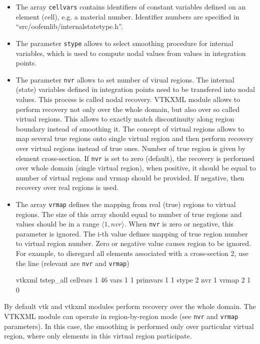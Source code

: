 \documentclass[a4paper]{article}
\newcommand{\param}[1]{\texttt{#1}} %
\begin{document}
\begin{itemize}
\begin{itemize}
\item The array \param{cellvars} contains identifiers of constant variables defined
on an element (cell), e.g. a material number. Identifier numbers are specified in
``src/oofemlib/internalstatetype.h''.

\item The parameter \param{stype} allows to select smoothing procedure for
internal variables, which is used to compute nodal values from values
in integration points.

\item The parameter \param{nvr} allows to set number of virual regions. The internal (state) variables defined in integration points need to be transfered into nodal values. This process is called nodal recovery. VTKXML module allows to perform recovery not only over the whole domain, but also over so called virtual regions. This allows to exactly match discontinuity along region boundary instead of smoothing it. The concept of virtual regions allows to map several true regions onto single virtual region and then perform recovery over virtual regions instead of true ones. Number of true region is given by element cross-section. If \param{nvr} is set to zero (default), the recovery is performed over whole domain (single virtual region), when positive, it should be equal to number of virtual regions and vrmap should be provided. If negative, then recovery over real regions is used.

\item The array \param{vrmap} defines the mapping from real (true) regions to virtual regions. The size of this array
should equal to number of true regions and values should be in a range $\langle 1, nvr \rangle$. When \param{nvr} is zero or negative, this parameter is ignored. The i-th value defines mapping of true region number to virtual region number. Zero or negative value causes region to be ignored. For example, to disregard all elements associated with a cross-section 2, use the line (relevant are \param{nvr} and \param{vrmap})

{\footnotesize vtkxml tstep\_all cellvars 1 46 vars 1 1 primvars 1 1 stype 2 nvr 1 vrmap 2 1 0}


\end{itemize}

By default vtk and vtkxml modules perform recovery over the whole domain. The VTKXML module can operate in region-by-region mode (see \param{nvr} and \param{vrmap} parameters). In this case, the smoothing is performed only over particular virtual region, where only elements in this virtual region participate. 


\end{itemize}
\end{document}
